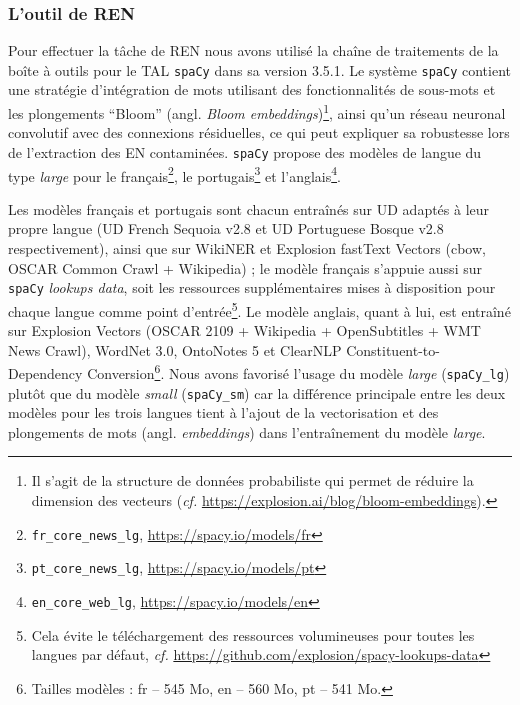 \subsubsection{L'outil de REN}
\label{subsubsec:spacy_REN}
Pour effectuer la tâche de REN
nous avons utilisé la chaîne de traitements de la boîte à outils pour le TAL \texttt{spaCy} dans sa version 3.5.1. %
Le système \texttt{spaCy} contient une stratégie d'intégration de mots utilisant des fonctionnalités de sous-mots et les plongements ``Bloom'' (angl. \textit{Bloom embeddings})\footnote{Il s'agit de la structure de données probabiliste qui permet de réduire la dimension des vecteurs (\textit{cf.} \url{https://explosion.ai/blog/bloom-embeddings}).}, ainsi qu'un réseau neuronal convolutif avec des connexions résiduelles, ce qui peut expliquer sa robustesse lors de l'extraction des EN contaminées. \texttt{spaCy} propose des modèles de langue du type \textit{large} pour le français\footnote{\texttt{fr\_core\_news\_lg}, \url{https://spacy.io/models/fr}}, le portugais\footnote{\texttt{pt\_core\_news\_lg}, \url{https://spacy.io/models/pt}} et l'anglais\footnote{\texttt{en\_core\_web\_lg}, \url{https://spacy.io/models/en}}. 

Les modèles français et portugais sont chacun entraînés sur UD adaptés à leur propre langue (UD French Sequoia v2.8 et UD Portuguese Bosque v2.8 respectivement), ainsi que sur WikiNER et Explosion fastText Vectors (cbow, OSCAR Common Crawl + Wikipedia) ; le modèle français s'appuie aussi sur \texttt{spaCy} \textit{lookups data}, soit les ressources supplémentaires mises à disposition pour chaque langue comme point d’entrée\footnote{Cela évite le téléchargement des ressources volumineuses pour toutes les langues par défaut, \textit{cf.} \url{https://github.com/explosion/spacy-lookups-data}}. Le modèle anglais, quant à lui, est entraîné sur Explosion Vectors (OSCAR 2109 + Wikipedia + OpenSubtitles + WMT News Crawl), WordNet 3.0, OntoNotes 5 et ClearNLP Constituent-to-Dependency Conversion\footnote{Tailles modèles : fr -- 545 Mo, en -- 560 Mo, pt -- 541 Mo.}. Nous avons favorisé l'usage du modèle \textit{large} (\texttt{spaCy\_lg}) plutôt que du modèle \textit{small} (\texttt{spaCy\_sm}) car la différence principale entre les deux modèles pour les trois langues tient à l'ajout de la vectorisation et des plongements de mots (angl. \textit{embeddings}) dans l'entraînement du modèle \textit{large}.




